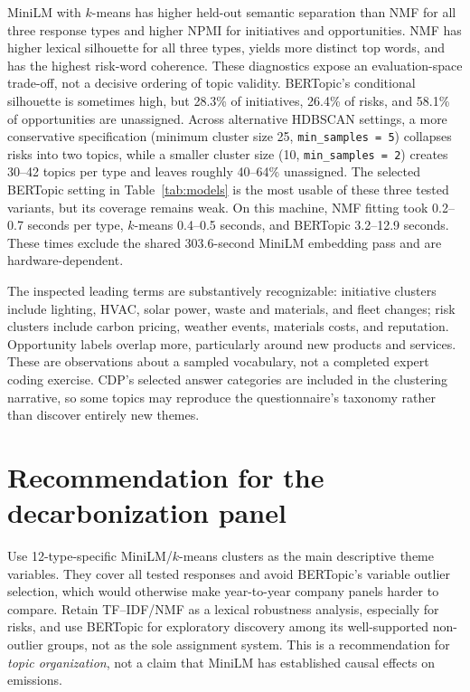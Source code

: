 \documentclass[11pt,a4paper]{article}
\begin{document}
MiniLM with $k$-means has higher held-out semantic separation than NMF for
all three response types and higher NPMI for initiatives and opportunities.
NMF has higher lexical silhouette for all three types, yields more distinct
top words, and has the highest risk-word coherence. These diagnostics expose
an evaluation-space trade-off, not a decisive ordering of topic validity.
BERTopic's conditional silhouette is sometimes high, but 28.3\% of
initiatives, 26.4\% of risks, and 58.1\% of opportunities are unassigned.
Across alternative HDBSCAN settings, a more conservative specification
(minimum cluster size 25, \texttt{min\_samples = 5}) collapses risks into
two topics, while a smaller cluster size (10, \texttt{min\_samples = 2})
creates 30--42 topics per type and leaves roughly 40--64\% unassigned.
The selected BERTopic setting in Table~\ref{tab:models} is the most usable
of these three tested variants, but its coverage remains weak.
On this machine, NMF fitting took 0.2--0.7 seconds per type, $k$-means
0.4--0.5 seconds, and BERTopic 3.2--12.9 seconds. These times exclude the
shared 303.6-second MiniLM embedding pass and are hardware-dependent.

The inspected leading terms are substantively recognizable: initiative
clusters include lighting, HVAC, solar power, waste and materials, and fleet
changes; risk clusters include carbon pricing, weather events, materials
costs, and reputation. Opportunity labels overlap more, particularly around
new products and services. These are observations about a sampled vocabulary,
not a completed expert coding exercise. CDP's selected answer categories are
included in the clustering narrative, so some topics may reproduce the
questionnaire's taxonomy rather than discover entirely new themes.

\section{Recommendation for the decarbonization panel}
Use 12-type-specific MiniLM/$k$-means clusters as the main descriptive theme
variables. They cover all tested responses and avoid BERTopic's variable
outlier selection, which would otherwise make year-to-year company panels
harder to compare. Retain TF--IDF/NMF as a lexical robustness analysis,
especially for risks, and use BERTopic for exploratory discovery among its
well-supported non-outlier groups, not as the sole assignment system.
This is a recommendation for \emph{topic organization}, not a claim that
MiniLM has established causal effects on emissions.
\end{document}
